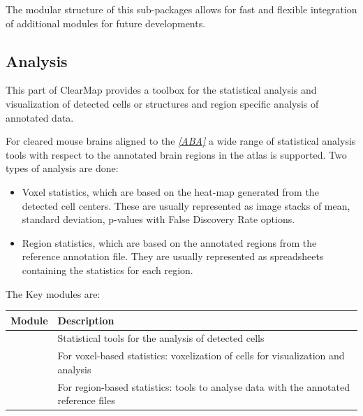 \documentclass[letterpaper,10pt,english]{sphinxmanual}
\begin{document}
The modular structure of this sub-packages allows for fast and flexible integration of
additional modules for future developments.


\subsection{Analysis}
\label{introduction:analysis}
This part of ClearMap provides a toolbox for the statistical analysis and
visualization of detected cells or structures and region specific analysis
of annotated data.

For cleared mouse brains aligned to the \label{introduction:id5}{\hyperref[introduction:aba]{\emph{{[}ABA{]}}}} a wide range of statistical
analysis tools with respect to the annotated brain regions in the atlas is
supported. Two types of analysis are done:
\begin{itemize}
\item {} 
Voxel statistics, which are based on the heat-map generated from the detected cell centers. These are usually represented as image stacks of mean, standard deviation, p-values with False Discovery Rate options.

\item {} 
Region statistics, which are based on the annotated regions from the reference annotation file. They are usually represented as spreadsheets containing the statistics for each region.

\end{itemize}

The Key modules are:

\begin{tabulary}{\linewidth}{|L|L|}
\hline
\textsf{\relax 
Module
} & \textsf{\relax 
Description
}\\
\hline
{\hyperref[api/ClearMap.Analysis:module-ClearMap.Analysis.Statistics]{\emph{}}}
 & 
Statistical tools for the analysis of detected cells
\\
\hline
{\hyperref[api/ClearMap.Analysis:module-ClearMap.Analysis.Voxelization]{\emph{}}}
 & 
For voxel-based statistics: voxelization of cells for visualization and analysis
\\
\hline
{\hyperref[api/ClearMap.Analysis:module-ClearMap.Analysis.Label]{\emph{}}}
 & 
For region-based statistics: tools to analyse data with the annotated reference files
\\
\hline\end{tabulary}
\end{document}
